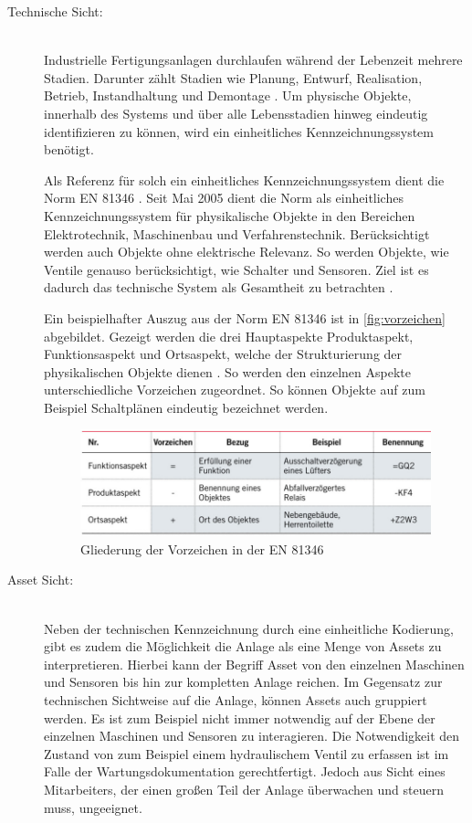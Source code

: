 \begin{description}
    \item[Technische Sicht:]\hfill \\
    Industrielle Fertigungsanlagen durchlaufen während der Lebenzeit mehrere Stadien. Darunter zählt Stadien wie Planung, Entwurf, Realisation, Betrieb, Instandhaltung und Demontage \cite{StefanSchwarzwalder.2019}. Um physische Objekte, innerhalb des Systems und über alle Lebensstadien hinweg eindeutig identifizieren zu können, wird ein einheitliches Kennzeichnungssystem benötigt.

    Als Referenz für solch ein einheitliches Kennzeichnungssystem dient die Norm \glqq EN 81346\grqq{} \cite{StefanSchwarzwalder.2019}. Seit Mai 2005 dient die Norm als einheitliches Kennzeichnungssystem für physikalische Objekte in den Bereichen Elektrotechnik, Maschinenbau und Verfahrenstechnik. Berücksichtigt werden auch Objekte ohne elektrische Relevanz. So werden Objekte, wie Ventile genauso berücksichtigt, wie Schalter und Sensoren. Ziel ist es dadurch das technische System als Gesamtheit zu betrachten \cite{StefanSchwarzwalder.2019}.

    Ein beispielhafter Auszug aus der Norm \glqq EN 81346\grqq{} ist in \autoref{fig:vorzeichen} abgebildet. Gezeigt werden die drei Hauptaspekte \glqq Produktaspekt\grqq{}, \glqq Funktionsaspekt\grqq{} und \glqq Ortsaspekt\grqq{}, welche der Strukturierung der physikalischen Objekte dienen \cite{StefanSchwarzwalder.2019}. So werden den einzelnen Aspekte unterschiedliche Vorzeichen zugeordnet. So können Objekte auf zum Beispiel Schaltplänen eindeutig bezeichnet werden.
    
    \begin{figure}[H]
        \centering
        \includegraphics[width=0.8\linewidth]{images/vorzeichen.png}
        \caption{Gliederung der Vorzeichen in der EN 81346 \cite{StefanSchwarzwalder.2019}}
        \label{fig:vorzeichen}
    \end{figure}

    \item[Asset Sicht:]\hfill \\
    Neben der technischen Kennzeichnung durch eine einheitliche Kodierung, gibt es zudem die Möglichkeit die Anlage als eine Menge von \glqq Assets\grqq{} zu interpretieren. Hierbei kann der Begriff \glqq Asset\grqq{} von den einzelnen Maschinen und Sensoren bis hin zur kompletten Anlage reichen. Im Gegensatz zur technischen Sichtweise auf die Anlage, können Assets auch gruppiert werden. Es ist zum Beispiel nicht immer notwendig auf der Ebene der einzelnen Maschinen und Sensoren zu interagieren. Die Notwendigkeit den Zustand von zum Beispiel einem hydraulischem Ventil zu erfassen ist im Falle der Wartungsdokumentation gerechtfertigt. Jedoch aus Sicht eines Mitarbeiters, der einen großen Teil der Anlage überwachen und steuern muss, ungeeignet.


\end{description}
